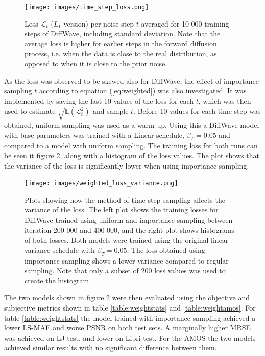 \documentclass{report}
\begin{document}
\begin{figure}[H]
    \centering
    \texttt{[image: images/time\_step\_loss.png]}
    \caption{\onehalfspacing Loss $\mathcal{L}_t$ ($L_1$ version) per noise step $t$ averaged for 10 000 training steps of DiffWave, including standard deviation. Note that the average loss is higher for earlier steps in the forward diffusion process, i.e. when the data is close to the real distribution, as opposed to when it is close to the prior noise.}
    \label{fig:timestep_loss}
\end{figure}

As the loss was observed to be skewed also for DiffWave, the effect of importance sampling $t$ according to equation (\ref{eq:weighted}) was also investigated. It was implemented by saving the last 10 values of the loss for each $t$, which was then used to estimate $\sqrt{\mathbb{E}(\mathcal{L}_t^2)}$ and sample $t$. Before 10 values for each time step was obtained, uniform sampling was used as a warm up. Using this a DiffWave model with base parameters was trained with a Linear schedule, $\beta_T=0.05$ and compared to a model with uniform sampling. The training loss for both runs can be seen it figure \ref{fig:loss_var}, along with a histogram of the loss values. The plot shows that the variance of the loss is significantly lower when using importance sampling.

\begin{figure}[H]
    \centering
    \texttt{[image: images/weighted\_loss\_variance.png]}
    \caption{\onehalfspacing Plots showing how the method of time step sampling affects the variance of the loss. The left plot shows the training losses for DiffWave trained using uniform and importance sampling between iteration 200 000 and 400 000, and the right plot shows histograms of both losses. Both models were trained using the original linear variance schedule with $\beta_T=0.05$. The loss obtained using importance sampling shows a lower variance compared to regular sampling. Note that only a subset of 200 loss values was used to create the histogram.}
    \label{fig:loss_var}
\end{figure}

The two models shown in figure \ref{fig:loss_var} were then evaluated using the objective and subjective metrics shown in table \ref{table:weightstats} and \ref{table:weightamos}. For table \ref{table:weightstats} the model trained with importance sampling achieved a lower LS-MAE and worse PSNR on both test sets. A marginally higher MRSE was achieved on LJ-test, and lower on Libri-test. For the AMOS the two models achieved similar results with no significant difference between them.
\end{document}
